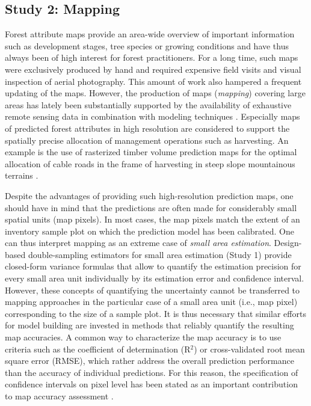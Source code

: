 \subsection{Study 2: Mapping} %
\label{sec:study2}


Forest attribute maps provide an area-wide overview of important information such as development stages, tree species or growing conditions and have thus always been of high interest for forest practitioners. For a long time, such maps were exclusively produced by hand and required expensive field visits and visual inspection of aerial photography. This amount of work also hampered a frequent updating of the maps. However, the production of maps (\textit{mapping}) covering large areas has lately been substantially supported by the availability of exhaustive remote sensing data in combination with modeling techniques \citep{brosofske2014}. Especially maps of predicted forest attributes in high resolution are considered to support the spatially precise allocation of management operations such as harvesting. An example is the use of rasterized timber volume prediction maps for the optimal allocation of cable roads in the frame of harvesting in steep slope mountainous terrains \citep{bont2012, bont2015}.\par

Despite the advantages of providing such high-resolution prediction maps, one should have in mind that the predictions are often made for considerably small spatial units (map pixels). In most cases, the map pixels match the extent of an inventory sample plot on which the prediction model has been calibrated. One can thus interpret mapping as an extreme case of \textit{small area estimation}. Design-based double-sampling estimators for small area estimation (Study 1) provide closed-form variance formulas that allow to quantify the estimation precision for every small area unit individually by its estimation error and confidence interval. However, these concepts of quantifying the uncertainty cannot be transferred to mapping approaches in the particular case of a small area unit (i.e., map pixel) corresponding to the size of a sample plot. It is thus necessary that similar efforts for model building are invested in methods that reliably quantify the resulting map accuracies. A common way to characterize the map accuracy is to use criteria such as the coefficient of determination (R$^2$) or cross-validated root mean square error (RMSE), which rather address the overall prediction performance than the accuracy of individual predictions. For this reason, the specification of confidence intervals on pixel level has been stated as an important contribution to map accuracy assessment \citep{mcroberts2010a}.\par

